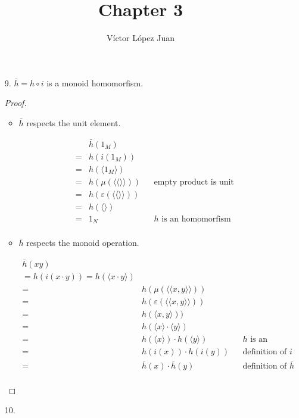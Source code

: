 \documentclass{article}
\author{Víctor López Juan}
\title{Chapter 3}
\begin{document}
\begin{enumerate}
  \item[9.]
    $\bar{h} = h \circ i$ is a monoid homomorfism.
    
    \begin{proof}
    \begin{itemize}
      Monoid homomorphisms must map identity elements to each other,
      and preserve the operation.
      
      \item

        $\bar{h}$ respects the unit element.
        
        \begin{align*}
          & \bar{h}(1_M)  \\
        = & h(i(1_M)) \\
        = & h(\langle 1_M \rangle)   \\
        = & h(μ(\langle \langle \rangle \rangle))           && \text{empty product is unit} \\
        = & h(ε(\langle \langle \rangle \rangle))   \\
        = & h(\langle \rangle)                             \\
        = & 1_N                                              && \text{$h$ is an homomorfism} \\
        \end{align*}

      \item

        $\bar{h}$ respects the monoid operation.

        \begin{align*}
           \bar{h}(xy) \\
         = h(i(x·y)) = h(\langle x·y \rangle)  \\
         = & h(μ(\langle \langle x, y \rangle \rangle))  \\
         = & h(ε(\langle \langle x, y \rangle \rangle))  \\
         = & h(\langle x, y \rangle))  \\
         = & h(\langle x \rangle \cdot \langle y \rangle)  \\
         = & h(\langle x \rangle) \cdot h(\langle y \rangle)  && \text{$h$ is an homomorfism} \\
         = & h(i(x)) \cdot h(i(y))                                    && \text{definition of $i$} \\
         = & \bar{h}(x) \cdot \bar{h}(y)                              && \text{definition of $\bar{h}$} \\
         \end{align*}
     \end{itemize}
    \end{proof}
  \item[10.]


\end{enumerate}
\end{document}
